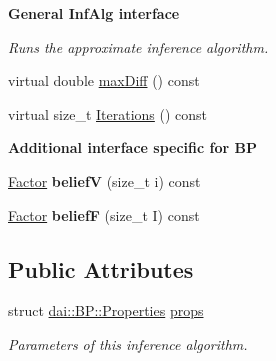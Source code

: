 \begin{Indent}{\bf General InfAlg interface}
\begin{CompactItemize}
\begin{CompactList}\small\item\em Runs the approximate inference algorithm. \item\end{CompactList}\item 
virtual double \hyperlink{classdai_1_1BP_9954b795f95ae1730d4e09a06afd8ee4}{maxDiff} () const 
\item 
virtual size\_\-t \hyperlink{classdai_1_1BP_be6cbc2992d38144198c8f4ea731a26e}{Iterations} () const 
\end{CompactItemize}
\end{Indent}
\begin{Indent}{\bf Additional interface specific for BP}\par
\begin{CompactItemize}
\item 
\hypertarget{classdai_1_1BP_a50b2f745fa1d796e6889f2db581a473}{
\hyperlink{classdai_1_1TFactor}{Factor} \textbf{beliefV} (size\_\-t i) const }
\label{classdai_1_1BP_a50b2f745fa1d796e6889f2db581a473}

\item 
\hypertarget{classdai_1_1BP_fbb68a79c555fac628c5fb79b9c45790}{
\hyperlink{classdai_1_1TFactor}{Factor} \textbf{beliefF} (size\_\-t I) const }
\label{classdai_1_1BP_fbb68a79c555fac628c5fb79b9c45790}

\end{CompactItemize}
\end{Indent}
\subsection*{Public Attributes}
\begin{CompactItemize}
\item 
\hypertarget{classdai_1_1BP_ba42a6eb1857b7f18f5072a25800ae63}{
struct \hyperlink{structdai_1_1BP_1_1Properties}{dai::BP::Properties} \hyperlink{classdai_1_1BP_ba42a6eb1857b7f18f5072a25800ae63}{props}}
\label{classdai_1_1BP_ba42a6eb1857b7f18f5072a25800ae63}

\begin{CompactList}\small\item\em Parameters of this inference algorithm. \item\end{CompactList}\end{CompactItemize}
